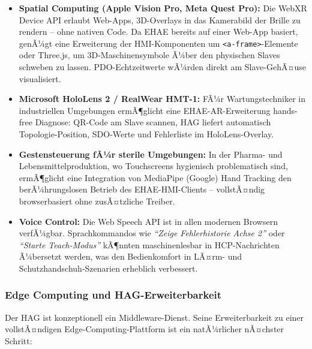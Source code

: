 ﻿\documentclass[12pt,a4paper]{article}
\begin{document}
\begin{itemize}[leftmargin=2em]
  \item \textbf{Spatial Computing (Apple Vision Pro, Meta Quest Pro):}
    Die WebXR Device API erlaubt Web-Apps, 3D-Overlays in das
    Kamerabild der Brille zu rendern -- ohne nativen Code. Da EHAE
    bereits auf einer Web-App basiert, genÃ¼gt eine Erweiterung der
    HMI-Komponenten um \texttt{<a-frame>}-Elemente oder Three.js, um
    3D-Maschinensymbole Ã¼ber den physischen Slaves schweben zu lassen.
    PDO-Echtzeitwerte wÃ¼rden direkt am Slave-GehÃ¤use visualisiert.
  \item \textbf{Microsoft HoloLens 2 / RealWear HMT-1:} FÃ¼r Wartungstechniker
    in industriellen Umgebungen ermÃ¶glicht eine EHAE-AR-Erweiterung
    hands-free Diagnose: QR-Code am Slave scannen, HAG liefert
    automatisch Topologie-Position, SDO-Werte und Fehlerliste im
    HoloLens-Overlay.
  \item \textbf{Gestensteuerung fÃ¼r sterile Umgebungen:} In der
    Pharma- und Lebensmittelproduktion, wo Touchscreens hygienisch
    problematisch sind, ermÃ¶glicht eine Integration von MediaPipe
    (Google) Hand Tracking den berÃ¼hrungslosen Betrieb des
    EHAE-HMI-Clients -- vollstÃ¤ndig browserbasiert ohne
    zusÃ¤tzliche Treiber.
  \item \textbf{Voice Control:} Die Web Speech API ist in allen
    modernen Browsern verfÃ¼gbar. Sprachkommandos wie \emph{``Zeige
    Fehlerhistorie Achse 2''} oder \emph{``Starte Teach-Modus''} kÃ¶nnten
    maschinenlesbar in HCP-Nachrichten Ã¼bersetzt werden,
    was den Bedienkomfort in LÃ¤rm- und Schutzhandschuh-Szenarien
    erheblich verbessert.
\end{itemize}

\subsubsection*{Edge Computing und HAG-Erweiterbarkeit}

Der HAG ist konzeptionell ein Middleware-Dienst. Seine Erweiterbarkeit zu einer
vollstÃ¤ndigen Edge-Computing-Plattform ist ein natÃ¼rlicher nÃ¤chster Schritt:
\end{document}
